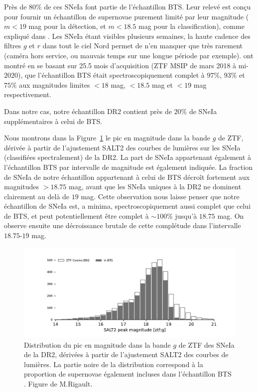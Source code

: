 \documentclass[../main/main.tex]{subfiles}
\begin{document}
Près de $80\%$ de ces SNeIa font partie de l'échantillon BTS. Leur relevé
est conçu pour fournir un échantillon de supernovae purement limité par
leur magnitude ($m<19$ mag pour la détection, et $m<18.5$ mag pour la
classification), comme expliqué dans
\citet{FremlingZTFspec2020,PerleyBTSII2020}. Les SNeIa étant visibles
plusieurs semaines, la haute cadence des filtres $g$ et $r$ dans tout le
ciel Nord permet de n'en manquer que très rarement (caméra hors service,
ou mauvais temps sur une longue période par
exemple). \citet{PerleyBTSII2020} ont montré en se basant sur 25.5 mois
d'acquisition (ZTF MSIP de mars 2018 à mi-2020), que l'échantillon BTS
était spectroscopiquement complet à $97\%$, $93\%$ et $75\%$ aux
magnitudes limites $<18$ mag, $<18.5$ mag et $<19$ mag respectivement.

Dans notre cas, notre échantillon DR2 contient près de $20\%$ de SNeIa
supplémentaires à celui de BTS.

Nous montrons dans la Figure~\ref{fig:target_peakmaggBTS} le pic en
magnitude dans la bande $g$ de ZTF, dérivée à partir de l'ajustement
SALT2 des courbes de lumières sur les SNeIa (classifiées spectralement) de
la DR2. La part de SNeIa appartenant également à
l'échantillon BTS par intervalle de magnitude est également indiquée. La fraction de SNeIa de
notre échantillon appartenant à celui de BTS décroît fortement
aux magnitudes $>18.75$ mag, avant que les SNeIa uniques à la DR2 ne
dominent clairement au delà de $19$ mag. Cette observation nous laisse
penser que notre échantillon de SNeIa est, a minima, spectroscopiquement
aussi complet que celui de BTS, et peut potentiellement être complet à $\sim100\%$
jusqu'à $18.75$ mag. On observe ensuite une décroissance brutale de cette complétude dans l'intervalle $18.75$-$19$ mag.

\begin{figure}[ht]
  \centering
  \includegraphics[width=1\textwidth]{../figures/09_dr2/target_peakmagg.pdf}
  \caption[Distribution du pic en
magnitude dans la bande $g$ de ZTF des SNeIa de la DR2.]{Distribution du pic en
magnitude dans la bande $g$ de ZTF des SNeIa de la DR2, dérivées à partir de l'ajustement
SALT2 des courbes de lumières. La partie noire de la distribution
correspond à la proportion de supernovae également incluses dans
l'échantillon BTS \citep{FremlingZTFspec2020,PerleyBTSII2020}. Figure de M.Rigault.}
  \label{fig:target_peakmaggBTS}
\end{figure}
\end{document}
